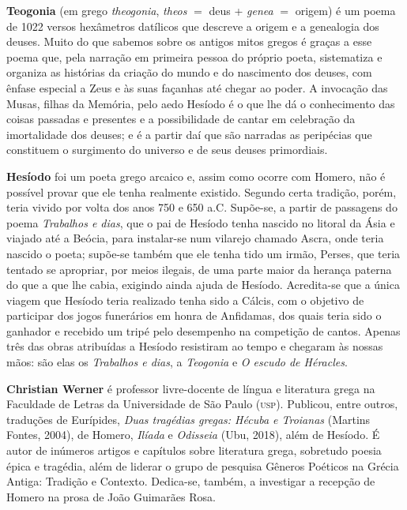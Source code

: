 \textbf{Teogonia} (em grego \textit{theogonia}, \textit{theos} $=$ deus +
\textit{genea} $=$ origem) é um poema de 1022 versos hexâmetros datílicos que
descreve a origem e a genealogia dos deuses. Muito do que sabemos sobre os
antigos mitos gregos é graças a esse poema que, pela narração em primeira
pessoa do próprio poeta, sistematiza e organiza as histórias da criação do
mundo e do nascimento dos deuses, com ênfase especial a Zeus e às suas façanhas até chegar ao poder. A invocação das Musas, filhas da Memória, pelo aedo Hesíodo é o que lhe dá o conhecimento das coisas passadas e presentes e a possibilidade de cantar em celebração da imortalidade dos deuses; e é a partir daí que são narradas as peripécias que constituem o surgimento do universo e de seus deuses primordiais.  

\textbf{Hesíodo} foi um poeta grego arcaico e, assim como ocorre com Homero, não é possível provar que ele tenha realmente existido. Segundo certa tradição, porém, teria vivido por volta dos anos 750 e 650 a.C.  Supõe-se, a partir de passagens do poema \textit{Trabalhos e dias}, que o pai de Hesíodo tenha nascido no litoral da Ásia e viajado até a Beócia, para instalar-se num vilarejo chamado Ascra, onde teria nascido o poeta; supõe-se também que ele tenha tido um irmão, Perses, que teria tentado se apropriar, por meios ilegais, de uma parte maior da herança paterna do que a que lhe cabia, exigindo ainda ajuda de Hesíodo. Acredita-se que a única viagem que Hesíodo teria realizado tenha sido a Cálcis, com o objetivo de participar dos jogos funerários em honra de Anfidamas, dos quais teria sido o ganhador e recebido um tripé pelo desempenho na competição de cantos. Apenas três das obras atribuídas a Hesíodo resistiram ao tempo e chegaram às nossas mãos: são elas os \textit{Trabalhos e dias}, a \textit{Teogonia} e \textit{O escudo de Héracles}.

\textbf{Christian Werner} é professor livre-docente de língua e literatura grega na Faculdade de Letras da Universidade de São Paulo (\textsc{usp}). Publicou, entre outros, traduções de Eurípides, \textit{Duas tragédias gregas: Hécuba e Troianas} (Martins Fontes, 2004), de Homero, \textit{Ilíada} e \textit{Odisseia} (Ubu, 2018), além de Hesíodo. É autor de inúmeros artigos e capítulos sobre literatura grega, sobretudo poesia épica e tragédia, além de liderar o grupo de pesquisa Gêneros Poéticos na Grécia Antiga: Tradição e Contexto. Dedica-se, também, a investigar a recepção de Homero na prosa de João Guimarães Rosa.

